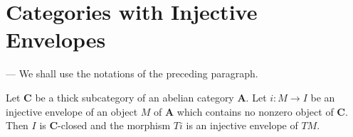 %
%

\section{Categories with Injective Envelopes}
--- We shall use the notations of the preceding paragraph.

\begin{proposition}
Let $\mathbf{C}$ be a thick subcategory of an abelian category
$\mathbf{A}$. Let $i\colon M\to I$ be an injective envelope of an object
$M$ of $\mathbf{A}$ which contains no nonzero object of $\mathbf{C}$. Then
$I$ is $\mathbf{C}$-closed and the morphism $Ti$ is an injective envelope
of $TM$.
\end{proposition}

